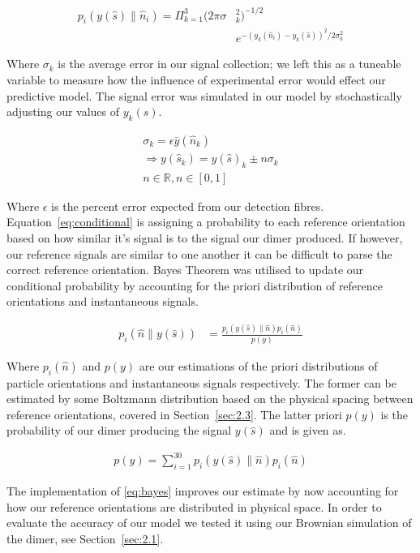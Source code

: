 \documentclass[final, 3p]{elsarticle}
\begin{document}
\begin{align}
	\label{eq:conditional}
	p_i(y(\hat{s})\parallel\hat{n}_i) = \Pi^3_{k=1}
	(2\pi\sigma&_k^2)^{-1/2}  \nonumber \\
	&e^{-(y_{k}(\hat{n}_i)-y_{k}(\hat{s}))^2/2\sigma_k^2}
\end{align}

Where $\sigma_k$ is the average error in our signal collection; we left this as a tuneable variable to measure how the influence of experimental error would effect our predictive model. The signal error was simulated in our model by stochastically adjusting our values of $y_k(\hat{s})$. 

\begin{eqnarray*}
	\sigma_k = \epsilon\bar{y}(\hat{n}_k) \\
	\Rightarrow y(\hat{s}_k) = y(\hat{s})_k \pm n\sigma_k \\ 
	n \in \mathbb{R}, n\in[0,1]
\end{eqnarray*} 

Where $\epsilon$ is the percent error expected from our detection fibres. Equation~\eqref{eq:conditional} is assigning a probability to each reference orientation based on how similar it's signal is to the signal our dimer produced. If however, our reference signals are similar to one another it can be difficult to parse the correct reference orientation. Bayes Theorem was utilised to update our conditional probability by accounting for the priori distribution of reference orientations and instantaneous signals. 

\begin{align}
	\label{eq:bayes}
	p_i(\hat{n}\parallel y(\hat{s}))&= \frac{p_i(y(\hat{s})\parallel\hat{n})p_i(\hat{n})}{p(y)}
\end{align}

Where $p_i(\hat{n})$ and $p(y)$ are our estimations of the priori distributions of particle orientations and instantaneous signals respectively. The former can be estimated by some Boltzmann distribution based on the physical spacing between reference orientations, covered in Section~\ref{sec:2.3}. The latter priori $p(y)$ is the probability of our dimer producing the signal $y(\hat{s})$ and is given as. 

\begin{align}
	p(y) = \sum\limits_{i=1}^{30} p_i(y(\hat{s})\parallel\hat{n})p_i(\hat{n})
 \end{align}

The implementation of \eqref{eq:bayes} improves our estimate by now accounting for how our reference orientations are distributed in physical space. In order to evaluate the accuracy of our model we tested it using our Brownian simulation of the dimer, see Section~\ref{sec:2.1}.
\end{document}
